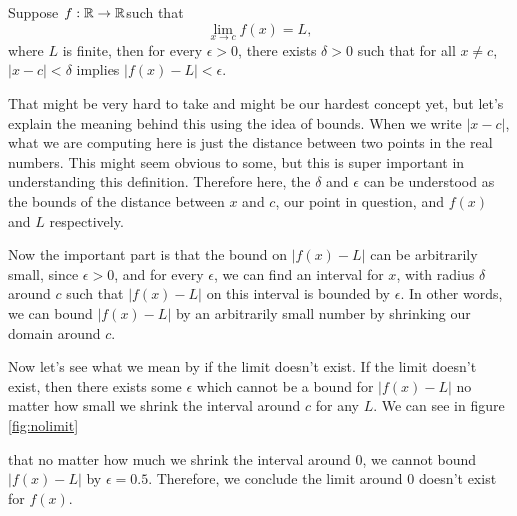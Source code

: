\begin{define}
Suppose $f:\mathbb{R}\to\mathbb{R}$\footnotemark such that
$$\lim_{x\to c}	f(x)=L,$$
where $L$ is finite, then for every $\epsilon>0$, there exists $\delta>0$ such that for all $x\neq c$, $|x-c|<\delta$ implies $|f(x)-L|<\epsilon$.
\label{def:limit}
\end{define}

That might be very hard to take and might be our hardest concept yet, but let's explain the meaning behind this using the idea of bounds.
When we write $|x-c|$, what we are computing here is just the distance between two points in the real numbers. This might seem obvious to some, but this is super important in understanding this definition.
Therefore here, the $\delta$ and $\epsilon$ can be understood as the bounds of the distance between $x$ and $c$, our point in question, and $f(x)$ and $L$ respectively.

Now the important part is that the bound on $|f(x)-L|$ can be arbitrarily small, since $\epsilon>0$, and for every $\epsilon$, we can find an interval for $x$, with radius $\delta$ around $c$ such that $|f(x)-L|$ on this interval is bounded by $\epsilon$. In other words, we can bound $|f(x)-L|$ by an arbitrarily small number by shrinking our domain around $c$.

Now let's see what we mean by if the limit doesn't exist. If the limit doesn't exist, then there exists some $\epsilon$ which cannot be a bound for $|f(x)-L|$ no matter how small we shrink the interval around $c$ for any $L$. We can see in figure \eqref{fig:nolimit} 
\begin{figure}[h]
	\centering
	\caption{}
	\label{fig:nolimit}
\end{figure}
that no matter how much we shrink the interval around 0, we cannot bound $|f(x)-L|$ by $\epsilon=0.5$. Therefore, we conclude the limit around 0 doesn't exist for $f(x)$.

